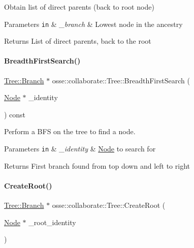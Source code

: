 Obtain list of direct parents (back to root node) 


\begin{DoxyParams}[1]{Parameters}
\mbox{\tt in}  & {\em \+\_\+branch} & Lowest node in the ancestry \\
\hline
\end{DoxyParams}
\begin{DoxyReturn}{Returns}
List of direct parents, back to the root 
\end{DoxyReturn}
\mbox{\label{classosse_1_1collaborate_1_1_tree_acb3448871b41ab199db72e3cdd4e23c2}} 
\paragraph{\texorpdfstring{Breadth\+First\+Search()}{BreadthFirstSearch()}}
{\footnotesize\ttfamily \hyperlink{structosse_1_1collaborate_1_1_tree_1_1_branch}{Tree\+::\+Branch} $\ast$ osse\+::collaborate\+::\+Tree\+::\+Breadth\+First\+Search (\begin{DoxyParamCaption}\item[{\hyperlink{classosse_1_1collaborate_1_1_node}{Node} $\ast$}]{\+\_\+identity }\end{DoxyParamCaption}) const}



Perform a B\+FS on the tree to find a node. 


\begin{DoxyParams}[1]{Parameters}
\mbox{\tt in}  & {\em \+\_\+identity} & \hyperlink{classosse_1_1collaborate_1_1_node}{Node} to search for \\
\hline
\end{DoxyParams}
\begin{DoxyReturn}{Returns}
First branch found from top down and left to right 
\end{DoxyReturn}
\mbox{\label{classosse_1_1collaborate_1_1_tree_adfe5d9fa445a38113939f33b61b37a08}} 
\paragraph{\texorpdfstring{Create\+Root()}{CreateRoot()}}
{\footnotesize\ttfamily \hyperlink{structosse_1_1collaborate_1_1_tree_1_1_branch}{Tree\+::\+Branch} $\ast$ osse\+::collaborate\+::\+Tree\+::\+Create\+Root (\begin{DoxyParamCaption}\item[{\hyperlink{classosse_1_1collaborate_1_1_node}{Node} $\ast$}]{\+\_\+root\+\_\+identity }\end{DoxyParamCaption})}



